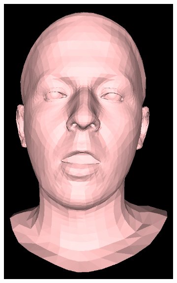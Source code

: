\begin{figure}[h]
\begin{subfigure}[b]{0.19\textwidth}
        \includegraphics[width=\textwidth]{figures/voca_exp/vocaset_exp4.png}
    \end{subfigure}
    \begin{subfigure}[b]{0.19\textwidth}

\end{subfigure}
\end{figure}
